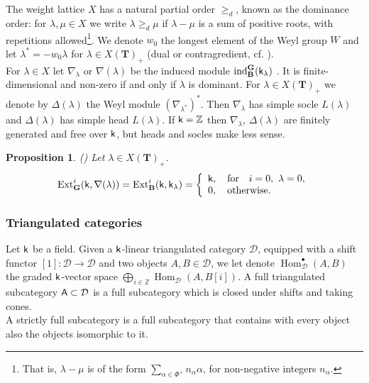 \documentclass[sn-mathphys-num]{sn-jnl}%
\newcommand{\D}{\mathcal D}
\newcommand{\ind}{{\mathrm{ind}}}
\newcommand{\Ext}{{\mathrm{Ext}}}
\newcommand*{\Hom}{\mathop{\mathrm {Hom}}\nolimits}
\newcommand{\A}{{\sf A}}
\newcommand{\sk}{{\sf k}}
\newcommand{\Z}{{\mathbb Z}}
\newcommand{\bg}{\mathbf G}
\newcommand{\fb}{\mathbf B}
\newcommand{\bt}{\mathbf T}
\newtheorem{proposition}[theorem]{Proposition}
\theoremstyle{definition}
\begin{document}
The weight lattice $X$ has a natural partial order $\geq_d$, known as the dominance order: 
for $\lambda,\mu \in X$ we write $\lambda \geq_d \mu$ if $\lambda - \mu$ is a sum of positive roots, with repetitions allowed\footnote{That is, $\lambda -\mu$ is of the form
$\sum _{\alpha\in \Phi ^+}n_{\alpha}\alpha$, for non-negative integers $n_{\alpha}$.}. 
We denote $w_0$ the longest element of the Weyl group $W$ and let $\lambda ^{\ast} = -w_0\lambda$ for $\lambda \in X(\bt)_+$ (dual or contragredient, cf. \cite[Section 2.2]{Hummodular}).\\
 
For $\lambda \in X$ let %
$\nabla _{\lambda}$ or $\nabla(\lambda)$ be the induced module $\ind_{\fb}^{ \bg}({\sk}_{\lambda})$ \cite[I, Section 3.3]{Jan}. 
It is finite-dimensional and non-zero if and only if $\lambda$ is dominant. 
For $\lambda \in X(\bt)_+$ we denote by $\Delta (\lambda)$ the Weyl module $(\nabla _{\lambda^{\ast}})^{\ast}$. Then $\nabla _{\lambda}$  has simple socle $L(\lambda)$ and $\Delta (\lambda)$ has simple head $L(\lambda)$. 
If $\sk=\Z$ then  $\nabla _{\lambda}$, $\Delta (\lambda)$ are finitely generated and free over $\sk$, but heads and socles make less sense.\\

\begin{proposition}\label{prop:cohinduced}(\cite[II Proposition 4.13, B.4]{Jan})
Let $\lambda\in X(\bt)_+$. 
\begin{equation*}
\Ext ^i_{\bg}(\sk,\nabla(\lambda)) = \Ext ^i_{\fb}(\sk,\sk_\lambda)=\left\{
   \begin{array}{l}
    {\sf k}, \quad {\rm for} \quad i=0, \  \lambda=0,\\
    0, \quad {\rm otherwise}. \\
   \end{array}
  \right.
\end{equation*}
\end{proposition}
\subsubsection{Triangulated categories}\label{subsec:triangulated}

Let $\sk$ be a field. Given a $\sk$-linear triangulated category $\D$, equipped with a shift functor $[1]\colon \D \rightarrow \D$ and two
objects $A,B\in \D$, we let denote $\Hom ^{\bullet}_{\D}(A,B)$ 
the graded $\sk$-vector space $\bigoplus _{i\in \mathbb Z}{\Hom} _{\D}(A,B[i])$. A full triangulated subcategory $\A \subset \D$ is a full subcategory which is closed under shifts and taking cones.\\
A strictly full subcategory is a full subcategory that contains with every object also the objects isomorphic to it.
\end{document}
